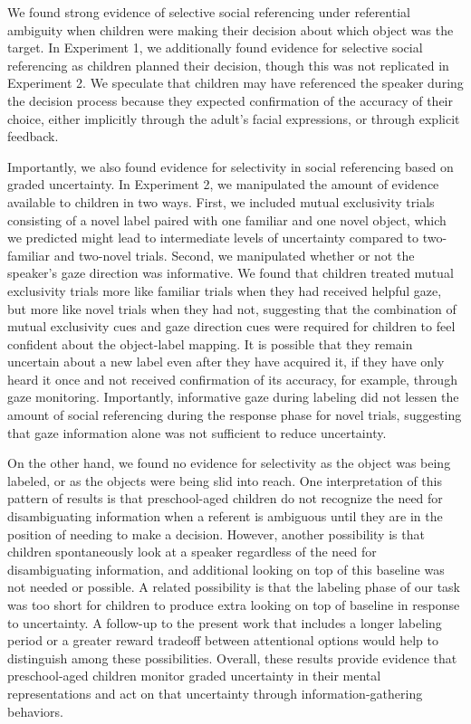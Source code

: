\documentclass[10pt, letterpaper]{article}
\begin{document}
We found strong evidence of selective social referencing under
referential ambiguity when children were making their decision about
which object was the target. In Experiment 1, we additionally found
evidence for selective social referencing as children planned their
decision, though this was not replicated in Experiment 2. We speculate
that children may have referenced the speaker during the decision
process because they expected confirmation of the accuracy of their
choice, either implicitly through the adult's facial expressions, or
through explicit feedback.

Importantly, we also found evidence for selectivity in social
referencing based on graded uncertainty. In Experiment 2, we manipulated
the amount of evidence available to children in two ways. First, we
included mutual exclusivity trials consisting of a novel label paired
with one familiar and one novel object, which we predicted might lead to
intermediate levels of uncertainty compared to two-familiar and
two-novel trials. Second, we manipulated whether or not the speaker's
gaze direction was informative. We found that children treated mutual
exclusivity trials more like familiar trials when they had received
helpful gaze, but more like novel trials when they had not, suggesting
that the combination of mutual exclusivity cues and gaze direction cues
were required for children to feel confident about the object-label
mapping. It is possible that they remain uncertain about a new label
even after they have acquired it, if they have only heard it once and
not received confirmation of its accuracy, for example, through gaze
monitoring. Importantly, informative gaze during labeling did not lessen
the amount of social referencing during the response phase for novel
trials, suggesting that gaze information alone was not sufficient to
reduce uncertainty.

On the other hand, we found no evidence for selectivity as the object
was being labeled, or as the objects were being slid into reach. One
interpretation of this pattern of results is that preschool-aged
children do not recognize the need for disambiguating information when a
referent is ambiguous until they are in the position of needing to make
a decision. However, another possibility is that children spontaneously
look at a speaker regardless of the need for disambiguating information,
and additional looking on top of this baseline was not needed or
possible. A related possibility is that the labeling phase of our task
was too short for children to produce extra looking on top of baseline
in response to uncertainty. A follow-up to the present work that
includes a longer labeling period or a greater reward tradeoff between
attentional options would help to distinguish among these possibilities.
Overall, these results provide evidence that preschool-aged children
monitor graded uncertainty in their mental representations and act on
that uncertainty through information-gathering behaviors.
\end{document}
